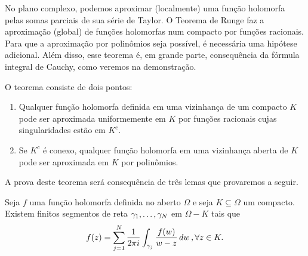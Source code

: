     No plano complexo, podemos aproximar (localmente) uma função holomorfa pelas somas parciais 
    de sua série de Taylor. O Teorema de Runge faz a aproximação (global) de funções holomorfas 
    num compacto por funções racionais. Para que a aproximação por polinômios seja possível, 
    é necessária uma hipótese adicional. Além disso, esse teorema é, em grande parte, 
    consequência da fórmula integral de Cauchy, como veremos na demonstração.
    \begin{teorema}[Runge]
    \label{TR}
        O teorema consiste de dois pontos:
        \begin{enumerate}
            \item Qualquer função holomorfa definida em uma vizinhança de um compacto $K$ 
            pode ser aproximada uniformemente em $K$ por funções racionais cujas singularidades 
            estão em $K^c$.
            \item Se $K^c$ é conexo, qualquer função holomorfa em uma vizinhança aberta de $K$ 
            pode ser aproximada em $K$ por polinômios.
        \end{enumerate}
    \end{teorema}
    A prova deste teorema será consequência de três lemas que provaremos a seguir.
    \begin{lema}
    \label{LR1}
        Seja $f$ uma função holomorfa definida no aberto $\Omega$ e seja $K \subseteq \Omega$ 
        um compacto. Existem finitos segmentos de reta $\gamma_1, \dots, \gamma_N$ em 
        $\Omega - K$ tais que
        \begin{equation*}
        f(z) 
        = 
        \sum^N_{j=1}\frac{1}{2 \pi i} \int_{\gamma_j}\frac{f(w)}{w-z} \, dw  \, , \forall z \in K.
        \end{equation*}
    \end{lema}

